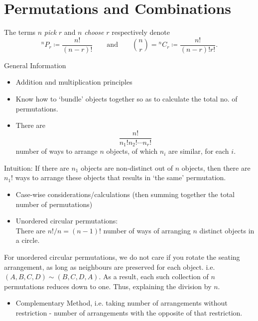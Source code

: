 \documentclass[oneside]{book}
\begin{document}
\chapter{Permutations and Combinations}
\begin{definition}{}{}
  The terms \(n\) \emph{pick} \(r\) and \(n\) \emph{choose} \(r\) respectively denote 
  \[{^n}P_r \coloneq  \frac{n!}{(n-r)!} \qquad\text{and}\qquad \binom{n}{r}={^n}C_r\coloneq \frac{n!}{(n-r)!r!}.\]
\end{definition}
\begin{stbox}{General Information}
  \begin{itemize}
    \item Addition and multiplication principles
    \item Know how to `bundle' objects together so as to calculate the total no. of permutations.
    \item There are 
    \[\frac{n!}{n_1!n_2!\cdots n_r!}\]
    number of ways to arrange \(n\) objects, of which \(n_i\) are similar, for each \(i\).
  \end{itemize}
\end{stbox}
    \begin{fact}
      Intuition: If there are \(n_1\) objects are non-distinct out of \(n\) objects, then there are \(n_1!\) ways to arrange these objects that results in `the same' permutation.
    \end{fact}
  \begin{stbox}{}
  \begin{itemize}
    \item Case-wise considerations/calculations (then summing together the total number of permutations)
    \item Unordered circular permutations:\\
    There are \(n!/n=(n-1)!\) number of ways of arranging \(n\) distinct objects in a circle.
  \end{itemize}
\end{stbox}
    \begin{fact}
      For unordered circular permutations, we do not care if you rotate the seating arrangement, as long as neighbours are preserved for each object. i.e. \((A,B,C,D) \sim (B,C,D,A)\). As a result, each such collection of \(n\) permutations reduces down to one. Thus, explaining the division by \(n\).
    \end{fact}
\begin{stbox}{}
\begin{itemize}
    \item Complementary Method, i.e. taking number of arrangements without restriction - number of arrangements with the opposite of that restriction.
\end{itemize}
\end{stbox}
\end{document}
